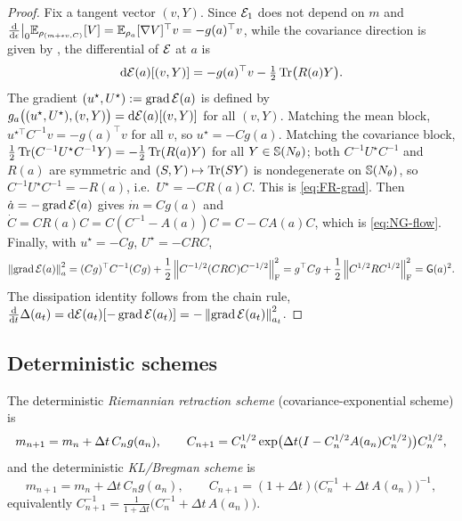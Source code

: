\begin{proof}
Fix a tangent vector $(v,Y)$. Since $\mathcal{E}_1$ does not depend on $m$ and
$\tfrac{\mathrm{d}}{\mathrm{d}\epsilon}\big|_0\mathbb{E}_{\rho_{(m+\epsilon v,C)}}[V]=\mathbb{E}_{\rho_a}[\nabla V]^\top v=-g(a)^\top v$,
while the covariance direction is given by , the differential of
$\mathcal{E}$ at $a$ is
\begin{equation}
\label{eq:dE}
    \mathrm{d}\mathcal{E}(a)[(v,Y)]=-g(a)^\top v-\tfrac12\operatorname{Tr}\bigl(R(a)Y\bigr).
\end{equation}
The gradient $(u^\star,U^\star):=\operatorname{grad}\mathcal{E}(a)$ is defined by
$g_a\bigl((u^\star,U^\star),(v,Y)\bigr)=\mathrm{d}\mathcal{E}(a)[(v,Y)]$ for all $(v,Y)$. Matching the mean
block, $u^{\star\top}C^{-1}v=-g(a)^\top v$ for all $v$, so $u^\star=-Cg(a)$. Matching the
covariance block,
$\tfrac12\operatorname{Tr}(C^{-1}U^\star C^{-1}Y)=-\tfrac12\operatorname{Tr}(R(a)Y)$ for all $Y\in\mathbb{S}(N_\theta)$; both
$C^{-1}U^\star C^{-1}$ and $R(a)$ are symmetric and $(S,Y)\mapsto\operatorname{Tr}(SY)$ is nondegenerate on
$\mathbb{S}(N_\theta)$, so $C^{-1}U^\star C^{-1}=-R(a)$, i.e.\ $U^\star=-CR(a)C$. This is
\eqref{eq:FR-grad}. Then $\dot a=-\operatorname{grad}\mathcal{E}(a)$ gives $\dot m=Cg(a)$ and
$\dot C=CR(a)C=C(C^{-1}-A(a))C=C-CA(a)C$, which is \eqref{eq:NG-flow}. Finally, with
$u^\star=-Cg$, $U^\star=-CRC$,
\[
    \left\lVert \operatorname{grad}\mathcal{E}(a)\right\rVert_a^2
    =(Cg)^\top C^{-1}(Cg)+\frac12\left\lVert C^{-1/2}(CRC)C^{-1/2}\right\rVert_{\mathrm{F}}^2
    =g^\top Cg+\frac12\left\lVert C^{1/2}RC^{1/2}\right\rVert_{\mathrm{F}}^2
    =\mathsf{G}(a)^2 .
\]
The dissipation identity follows from the chain rule,
$\tfrac{\mathrm{d}}{\mathrm{d} t}\Delta(a_t)=\mathrm{d}\mathcal{E}(a_t)[-\operatorname{grad}\mathcal{E}(a_t)]=-\left\lVert \operatorname{grad}\mathcal{E}(a_t)\right\rVert_{a_t}^2$.
\end{proof}

\subsection{Deterministic schemes}

The deterministic \emph{Riemannian retraction scheme} (covariance-exponential scheme) is
\begin{equation}
\label{eq:Riem-det}
    m_{n+1}=m_n+\Delta t\,C_ng(a_n),
    \qquad
    C_{n+1}=C_n^{1/2}\exp\bigl(\Delta t(I-C_n^{1/2}A(a_n)C_n^{1/2})\bigr)C_n^{1/2},
\end{equation}
and the deterministic \emph{KL/Bregman scheme} is
\begin{equation}
\label{eq:KL-det}
    m_{n+1}=m_n+\Delta t\,C_ng(a_n),
    \qquad
    C_{n+1}=(1+\Delta t)\bigl(C_n^{-1}+\Delta t\,A(a_n)\bigr)^{-1},
\end{equation}
equivalently $C_{n+1}^{-1}=\tfrac1{1+\Delta t}\bigl(C_n^{-1}+\Delta t\,A(a_n)\bigr)$.

